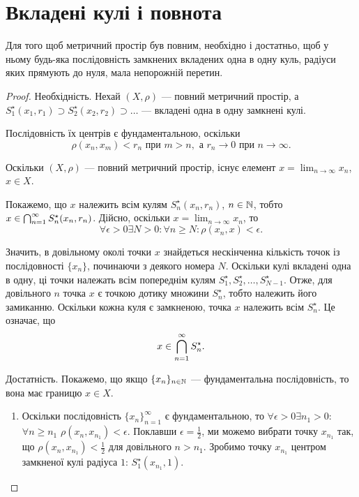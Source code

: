 \section{Вкладені кулі і повнота}

\begin{theorem}
 Для того щоб
метричний простір був повним, необхідно і достатньо, щоб
у ньому будь-яка послідовність замкнених вкладених одна в
одну куль, радіуси яких прямують до нуля, мала непорожній
перетин.
\end{theorem}

\begin{proof}
Необхідність. Нехай $(X, \rho)$ --- повний
метричний простір, а $S_1^\star(x_1, r_1) \supset S_2^\star(x_2, r_2) \supset \dots$ --- вкладені
одна в одну замкнені кулі.

Послідовність їх центрів є фундаментальною, оскільки
\begin{equation*}
    \rho(x_n, x_m) < r_n \text{ при } m > n, \text{ а } r_n \to 0 \text{ при } n \to \infty.
\end{equation*}

Оскільки $(X, \rho)$ --- повний метричний простір, існує
елемент $x = \lim_{n \to \infty} x_n$, $x \in X$.

Покажемо, що $x$ належить всім кулям $S_n^\star(x_n, r_n)$, $n \in \mathbb{N}$,
тобто $x \in \operatorname*{\bigcap}_{n = 1}^\infty S_n^\star(x_n, r_n)$. Дійсно, оскільки
$x = \lim_{n \to \infty} x_n$, то
\begin{equation*}
    \forall \epsilon > 0 \exists N > 0: \forall n \ge N: \rho(x_n, x) < \epsilon.    
\end{equation*}

Значить, в довільному околі точки $x$ знайдеться
нескінченна кількість точок із послідовності $\{x_n\}$,
починаючи з деякого номера $N$. Оскільки кулі вкладені
одна в одну, ці точки належать всім попереднім кулям
$S_1^\star, S_2^\star, \dots, S_{N - 1}^\star$.
Отже, для довільного $n$ точка $x$ є точкою
дотику множини $S_n^\star$, тобто належить його замиканню.
Оскільки кожна куля є замкненою, точка $x$ належить всім
$S_n^\star$. Це означає, що
\begin{equation*}
    x \in \operatorname*{\bigcap}_{n = 1}^\infty S_n^\star.
\end{equation*}

Достатність. Покажемо, що якщо $\{x_n\}_{n \in \mathbb{N}}$ ---
фундаментальна послідовність, то вона має границю $x \in X$.

\begin{enumerate}
\item Оскільки послідовність $\{x_n\}_{n = 1}^\infty$ є фундаментальною, то
$\forall \epsilon > 0 \exists n_1 > 0$:
$\forall n \ge n_1$ $\rho(x_n, x_{n_1}) < \epsilon$.
Поклавши $\epsilon = \frac{1}{2}$, ми можемо вибрати точку
$x_{n_1}$ так, що $\rho(x_n, x_{n_1}) < \frac{1}{2}$ для
довільного $n > n_1$. Зробимо точку
$x_{n_1}$ центром замкненої кулі радіуса $1$: 
$S_1^\star(x_{n_1}, 1)$.


\end{enumerate}
\end{proof}
